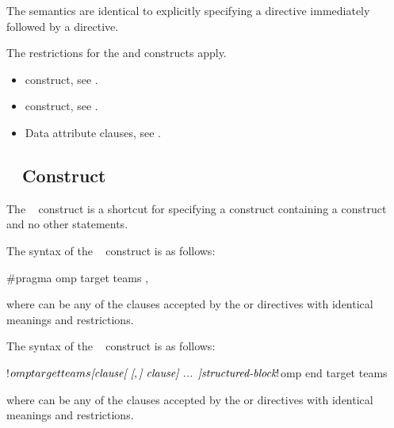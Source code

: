 \descr
The semantics are identical to explicitly specifying a  directive
immediately followed by a  directive.

\restrictions

The restrictions for the  and  constructs apply.

\crossreferences
\begin{itemize}
\item {} construct, see
.

\item {} construct, see
.

\item Data attribute clauses, see
.
\end{itemize}



\subsection{~ Construct}
\label{subsec:target teams Construct}
\summary
The ~ construct is a shortcut for specifying 
a  construct containing a  construct and no other statements.

\syntax
\begin{ccppspecific}
The syntax of the ~ construct is as follows:

\begin{ompcPragma}
#pragma omp target teams \plc{[clause[ [},\plc{] clause] ... ] new-line}
\end{ompcPragma}

where  can be any of the clauses accepted by the  
or  directives with identical meanings and restrictions.
\end{ccppspecific}

\begin{fortranspecific}
The syntax of the ~ construct is as follows:

\begin{ompfPragma}
!$omp target teams \plc{[clause[ [},\plc{] clause] ... ]}
    \plc{structured-block}
!$omp end target teams
\end{ompfPragma}

where  can be any of the clauses accepted by the  
or  directives with identical meanings and restrictions.
\end{fortranspecific}

